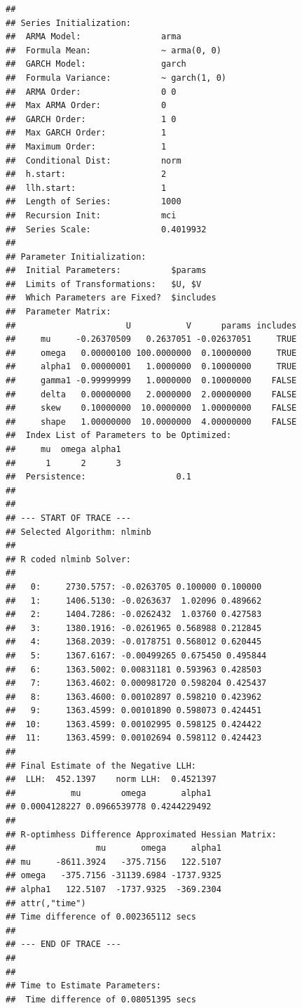 \documentclass[
]{book}
\theoremstyle{definition}
\theoremstyle{definition}
\theoremstyle{definition}
\theoremstyle{definition}
\theoremstyle{remark}
\begin{document}
\begin{verbatim}
## 
## Series Initialization:
##  ARMA Model:                arma
##  Formula Mean:              ~ arma(0, 0)
##  GARCH Model:               garch
##  Formula Variance:          ~ garch(1, 0)
##  ARMA Order:                0 0
##  Max ARMA Order:            0
##  GARCH Order:               1 0
##  Max GARCH Order:           1
##  Maximum Order:             1
##  Conditional Dist:          norm
##  h.start:                   2
##  llh.start:                 1
##  Length of Series:          1000
##  Recursion Init:            mci
##  Series Scale:              0.4019932
## 
## Parameter Initialization:
##  Initial Parameters:          $params
##  Limits of Transformations:   $U, $V
##  Which Parameters are Fixed?  $includes
##  Parameter Matrix:
##                      U           V      params includes
##     mu     -0.26370509   0.2637051 -0.02637051     TRUE
##     omega   0.00000100 100.0000000  0.10000000     TRUE
##     alpha1  0.00000001   1.0000000  0.10000000     TRUE
##     gamma1 -0.99999999   1.0000000  0.10000000    FALSE
##     delta   0.00000000   2.0000000  2.00000000    FALSE
##     skew    0.10000000  10.0000000  1.00000000    FALSE
##     shape   1.00000000  10.0000000  4.00000000    FALSE
##  Index List of Parameters to be Optimized:
##     mu  omega alpha1 
##      1      2      3 
##  Persistence:                  0.1 
## 
## 
## --- START OF TRACE ---
## Selected Algorithm: nlminb 
## 
## R coded nlminb Solver: 
## 
##   0:     2730.5757: -0.0263705 0.100000 0.100000
##   1:     1406.5130: -0.0263637  1.02096 0.489662
##   2:     1404.7286: -0.0262432  1.03760 0.427583
##   3:     1380.1916: -0.0261965 0.568988 0.212845
##   4:     1368.2039: -0.0178751 0.568012 0.620445
##   5:     1367.6167: -0.00499265 0.675450 0.495844
##   6:     1363.5002: 0.00831181 0.593963 0.428503
##   7:     1363.4602: 0.000981720 0.598204 0.425437
##   8:     1363.4600: 0.00102897 0.598210 0.423962
##   9:     1363.4599: 0.00101890 0.598073 0.424451
##  10:     1363.4599: 0.00102995 0.598125 0.424422
##  11:     1363.4599: 0.00102694 0.598112 0.424423
## 
## Final Estimate of the Negative LLH:
##  LLH:  452.1397    norm LLH:  0.4521397 
##           mu        omega       alpha1 
## 0.0004128227 0.0966539778 0.4244229492 
## 
## R-optimhess Difference Approximated Hessian Matrix:
##                mu       omega     alpha1
## mu     -8611.3924   -375.7156   122.5107
## omega   -375.7156 -31139.6984 -1737.9325
## alpha1   122.5107  -1737.9325  -369.2304
## attr(,"time")
## Time difference of 0.002365112 secs
## 
## --- END OF TRACE ---
## 
## 
## Time to Estimate Parameters:
##  Time difference of 0.08051395 secs
\end{verbatim}
\end{document}
